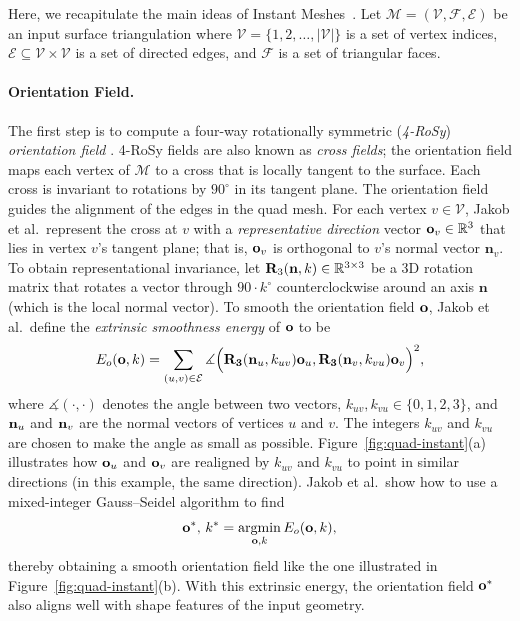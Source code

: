 Here, we recapitulate the main ideas of Instant Meshes~\cite{jakob2015instant}.  Let $\mathcal{M} = (\mathcal{V}, \mathcal{F}, \mathcal{E})$ be an input surface triangulation where $\mathcal{V} = \{ 1, 2, \ldots, |\mathcal{V}| \}$ is a set of vertex indices, $\mathcal{E} \subseteq \mathcal{V} \times \mathcal{V}$ is a set of directed edges, and $\mathcal{F}$ is a set of triangular faces.

\paragraph*{Orientation Field.}
The first step is to compute a four-way rotationally symmetric (\emph{4-RoSy}) \emph{orientation field} \cite{ray2008n}. 4-RoSy fields are also known as \emph{cross fields}; the orientation field maps each vertex of $\mathcal{M}$ to a cross that is locally tangent to the surface. Each cross is invariant to rotations by $90^\circ$ in its tangent plane. The orientation field guides the alignment of the edges in the quad mesh. For each vertex $v \in \mathcal{V}$, Jakob et al.\ represent the cross at $v$ with a \emph{representative direction} vector $\mathbf{o}_v \in \mathbb{R}^3$ that lies in vertex $v$'s tangent plane; that is, $\mathbf{o}_v$ is orthogonal to $v$'s normal vector $\mathbf{n}_v$. To obtain representational invariance, let $\mathbf{R}_3(\textbf{n}, k) \in \mathbb{R}^{3 \times 3}$ be a 3D rotation matrix that rotates a vector through $90 \cdot k^\circ$ counterclockwise around an axis $\textbf{n}$ (which is the local normal vector). To smooth the orientation field $\mathbf{o}$, Jakob et al.\ define the \emph{extrinsic smoothness \mbox{energy}} of $\mathbf{o}$ to be
\begin{equation*}
E_o(\mathbf{o}, k) = \sum_{(u,v) \in \mathcal{E}}
\measuredangle \Big(\mathbf{R_3} (\textbf{n}_u,k_{uv}) \mathbf{o}_u, \mathbf{R_3} (\textbf{n}_v,k_{vu}) \mathbf{o}_v\Big)^2,
\end{equation*}
where $\measuredangle(\cdot, \cdot)$ denotes the angle between two vectors, $k_{uv}, k_{vu} \in \{0, 1, 2, 3\}$, and $\mathbf{n}_u$ and $\mathbf{n}_v$ are the normal vectors of vertices $u$ and $v$. The integers $k_{uv}$ and $k_{vu}$ are chosen to make the angle as small as possible. Figure~\ref{fig:quad-instant}(a) illustrates how $\mathbf{o}_u$ and $\mathbf{o}_v$ are realigned by $k_{uv}$ and $k_{vu}$ to point in similar directions (in this example, the same direction). Jakob et al.\ show how to use a mixed-integer Gauss--Seidel algorithm to find
\begin{equation}
\mathbf{o}^*,\, k^* = \operatorname*{argmin}_{\mathbf{o}, k} E_o(\mathbf{o}, k) \label{eq:quad-im1},
\end{equation}
thereby obtaining a smooth orientation field like the one illustrated in Figure~\ref{fig:quad-instant}(b). With this extrinsic energy, the orientation field $\mathbf{o}^*$ also aligns well with shape features of the input geometry.

